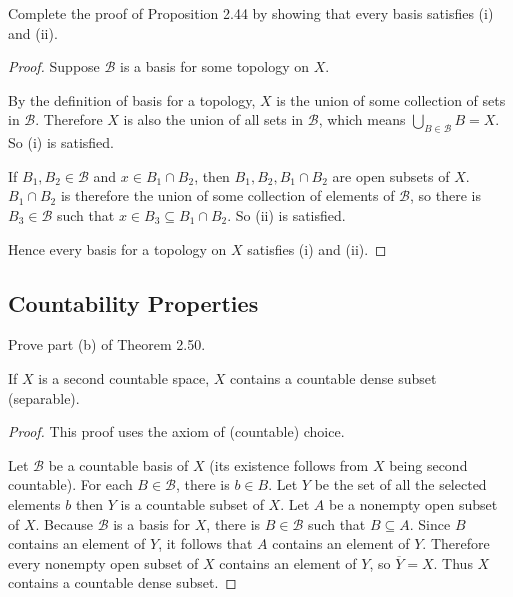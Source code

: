 \begin{exercise}{2.45}
	Complete the proof of Proposition 2.44 by showing that every basis satisfies (i) and (ii).
\end{exercise}

\begin{proof}
	Suppose $\mathscr{B}$ is a basis for some topology on $X$.

	By the definition of basis for a topology, $X$ is the union of some collection of sets in $\mathscr{B}$. Therefore $X$ is also the union of all sets in $\mathscr{B}$, which means $\bigcup_{B\in\mathscr{B}}B = X$. So (i) is satisfied.

	If $B_{1}, B_{2}\in\mathscr{B}$ and $x\in B_{1}\cap B_{2}$, then $B_{1}, B_{2}, B_{1}\cap B_{2}$ are open subsets of $X$. $B_{1}\cap B_{2}$ is therefore the union of some collection of elements of $\mathscr{B}$, so there is $B_{3}\in \mathscr{B}$ such that $x\in B_{3}\subseteq B_{1}\cap B_{2}$. So (ii) is satisfied.

	Hence every basis for a topology on $X$ satisfies (i) and (ii).
\end{proof}

\subsection*{Countability Properties}

\begin{exercise}{2.51}
	Prove part (b) of Theorem 2.50.

	If $X$ is a second countable space, $X$ contains a countable dense subset (separable).
\end{exercise}

\begin{proof}
	This proof uses the axiom of (countable) choice.

	Let $\mathscr{B}$ be a countable basis of $X$ (its existence follows from $X$ being second countable). For each $B\in\mathscr{B}$, there is $b\in B$. Let $Y$ be the set of all the selected elements $b$ then $Y$ is a countable subset of $X$. Let $A$ be a nonempty open subset of $X$. Because $\mathscr{B}$ is a basis for $X$, there is $B\in\mathscr{B}$ such that $B\subseteq A$. Since $B$ contains an element of $Y$, it follows that $A$ contains an element of $Y$. Therefore every nonempty open subset of $X$ contains an element of $Y$, so $\overline{Y} = X$. Thus $X$ contains a countable dense subset.
\end{proof}

